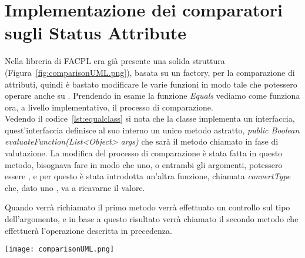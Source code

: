 

\section{Implementazione dei comparatori sugli Status Attribute} %
\label{sec:implementazione_dei_comparatori_sugli_status_attribute}
Nella libreria di FACPL era già presente una solida struttura (Figura~\ref{fig:comparisonUML.png}), basata su un factory, per la comparazione di attributi, quindi è bastato modificare le varie funzioni in modo tale che potessero operare anche su \statusattribute.
Prendendo in esame la funzione \textit{Equals} vediamo come funziona ora, a livello implementativo, il processo di comparazione.\\ 
Vedendo il codice~\ref{lst:equalclass} si nota che la classe implementa un interfaccia, quest'interfaccia definisce al suo interno un unico metodo astratto, \textit{public Boolean evaluateFunction(List<Object> args)} che sarà il metodo chiamato in fase di valutazione.
La modifica del processo di comparazione è stata fatta in questo metodo, bisognava fare in modo che uno, o entrambi gli argomenti, potessero essere \statusattribute, e per questo è stata introdotta un'altra funzione, chiamata \textit{convertType} che, dato uno \statusattribute, va a ricavarne il valore.\\ \par
Quando verrà richiamato il primo metodo verrà effettuato un controllo sul tipo dell'argomento, e in base a questo risultato verrà chiamato il secondo metodo che effettuerà l'operazione descritta in precedenza.



\begin{sidewaysfigure}
    \centering
	\texttt{[image: comparisonUML.png]}
    \caption{Grafico UML per la gerarchia di classi usate nella comparazione}
    \label{fig:comparisonUML.png}
\end{sidewaysfigure}


